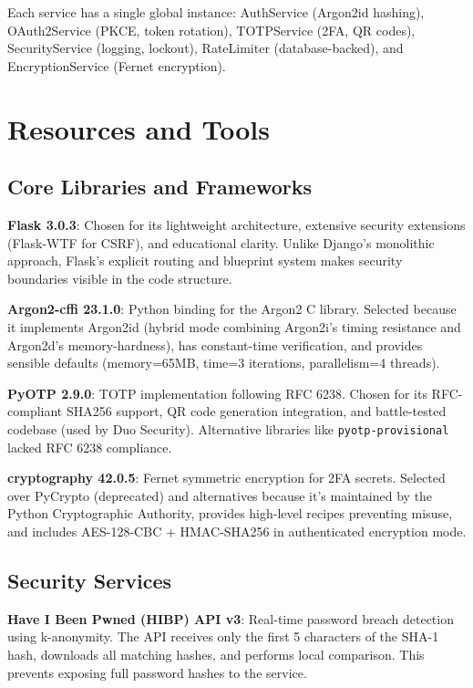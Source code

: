 \documentclass[12pt,a4paper]{article}
\begin{document}
Each service has a single global instance: AuthService (Argon2id hashing), OAuth2Service (PKCE, token rotation), TOTPService (2FA, QR codes), SecurityService (logging, lockout), RateLimiter (database-backed), and EncryptionService (Fernet encryption).

\section{Resources and Tools}

\subsection{Core Libraries and Frameworks}

\textbf{Flask 3.0.3}: Chosen for its lightweight architecture, extensive security extensions (Flask-WTF for CSRF), and educational clarity. Unlike Django's monolithic approach, Flask's explicit routing and blueprint system makes security boundaries visible in the code structure.

\textbf{Argon2-cffi 23.1.0}: Python binding for the Argon2 C library. Selected because it implements Argon2id (hybrid mode combining Argon2i's timing resistance and Argon2d's memory-hardness), has constant-time verification, and provides sensible defaults (memory=65MB, time=3 iterations, parallelism=4 threads).

\textbf{PyOTP 2.9.0}: TOTP implementation following RFC 6238. Chosen for its RFC-compliant SHA256 support, QR code generation integration, and battle-tested codebase (used by Duo Security). Alternative libraries like \texttt{pyotp-provisional} lacked RFC 6238 compliance.

\textbf{cryptography 42.0.5}: Fernet symmetric encryption for 2FA secrets. Selected over PyCrypto (deprecated) and alternatives because it's maintained by the Python Cryptographic Authority, provides high-level recipes preventing misuse, and includes AES-128-CBC + HMAC-SHA256 in authenticated encryption mode.

\subsection{Security Services}

\textbf{Have I Been Pwned (HIBP) API v3}: Real-time password breach detection using k-anonymity. The API receives only the first 5 characters of the SHA-1 hash, downloads all matching hashes, and performs local comparison. This prevents exposing full password hashes to the service.
\end{document}
